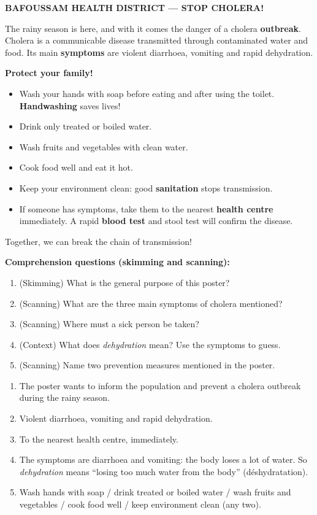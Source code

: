 \documentclass[11pt]{article}
\begin{document}
\begin{exemplebox}
\textbf{BAFOUSSAM HEALTH DISTRICT --- STOP CHOLERA!}

The rainy season is here, and with it comes the danger of a cholera \textbf{outbreak}. Cholera is a communicable disease transmitted through contaminated water and food. Its main \textbf{symptoms} are violent diarrhoea, vomiting and rapid dehydration.

\textbf{Protect your family!}
\begin{itemize}
\item Wash your hands with soap before eating and after using the toilet. \textbf{Handwashing} saves lives!
\item Drink only treated or boiled water.
\item Wash fruits and vegetables with clean water.
\item Cook food well and eat it hot.
\item Keep your environment clean: good \textbf{sanitation} stops transmission.
\item If someone has symptoms, take them to the nearest \textbf{health centre} immediately. A rapid \textbf{blood test} and stool test will confirm the disease.
\end{itemize}

Together, we can break the chain of transmission!
\end{exemplebox}

\textbf{Comprehension questions (skimming and scanning):}
\begin{enumerate}
\item (Skimming) What is the general purpose of this poster?
\item (Scanning) What are the three main symptoms of cholera mentioned?
\item (Scanning) Where must a sick person be taken?
\item (Context) What does \emph{dehydration} mean? Use the symptoms to guess.
\item (Scanning) Name two prevention measures mentioned in the poster.
\end{enumerate}

\begin{corrige}
\begin{enumerate}
\item The poster wants to inform the population and prevent a cholera outbreak during the rainy season.
\item Violent diarrhoea, vomiting and rapid dehydration.
\item To the nearest health centre, immediately.
\item The symptoms are diarrhoea and vomiting: the body loses a lot of water. So \emph{dehydration} means ``losing too much water from the body'' (déshydratation).
\item Wash hands with soap / drink treated or boiled water / wash fruits and vegetables / cook food well / keep environment clean (any two).
\end{enumerate}
\end{corrige}
\end{document}

